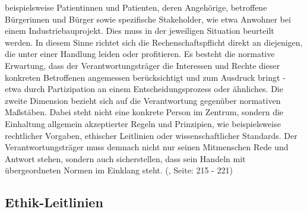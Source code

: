 beispielsweise Patientinnen und Patienten, deren Angehörige, betroffene Bürgerinnen und Bürger sowie spezifische Stakeholder, wie etwa Anwohner bei einem Industriebauprojekt. Dies muss in der jeweiligen Situation beurteilt werden. In diesem Sinne richtet sich die Rechenschaftspflicht direkt an diejenigen, die unter einer Handlung leiden oder profitieren. Es besteht die normative Erwartung, dass der Verantwortungsträger die Interessen und Rechte dieser konkreten Betroffenen angemessen berücksichtigt und zum Ausdruck bringt - etwa durch Partizipation an einem Entscheidungsprozess oder ähnliches. Die zweite Dimension bezieht sich auf die Verantwortung gegenüber normativen Maßstäben. Dabei steht nicht eine konkrete Person im Zentrum, sondern die Einhaltung allgemein akzeptierter Regeln und Prinzipien, wie beispielsweise rechtlicher Vorgaben, ethischer Leitlinien oder wissenschaftlicher Standards. Der Verantwortungsträger muss demnach nicht nur seinen Mitmenschen Rede und Antwort stehen, sondern auch sicherstellen, dass sein Handeln mit übergeordneten Normen im Einklang steht. (\cite{neuhaeuserHandbuchAngewandteEthik2023}, Seite: 215 - 221)


\subsection{Ethik-Leitlinien}

